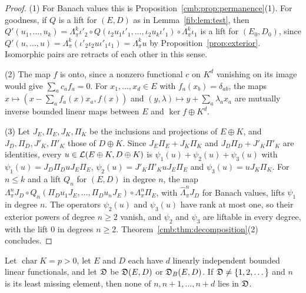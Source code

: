 \begin{proof}
(1) For Banach values this is Proposition~\ref{cmb:prop:permanence}(1). For goodness, if $Q$ is a lift for $(E,D)$ as in
Lemma~\ref{fib:lem:test}, then
$Q'(u_1,\dots,u_k)=\Lambda^k_\pi\iota'_2\circ Q(\iota_2u_1\iota'_1,\dots,\iota_2u_k\iota'_1)\circ\Lambda^k_\pi\iota_1$ is a
lift for $(E_0,D_0)$, since $Q'(u,\dots,u)=\Lambda^k_\pi(\iota'_2\iota_2u\iota'_1\iota_1)=\Lambda^k_\pi u$ by
Proposition~\ref{prop:exterior}. Isomorphic pairs are retracts of each other in this sense.

(2) The map $f$ is onto, since a nonzero functional $c$ on $K^d$ vanishing on its image would give $\sum_ac_af_a=0$. For
$x_1,\dots,x_d\in E$ with $f_a(x_b)=\delta_{ab}$, the maps $x\mapsto(x-\sum_af_a(x)x_a,f(x))$ and
$(y,\lambda)\mapsto y+\sum_a\lambda_ax_a$ are mutually inverse bounded linear maps between $E$ and $\ker f\oplus K^d$.

(3) Let $J_E,\Pi_E,J_K,\Pi_K$ be the inclusions and projections of $E\oplus K$, and $J_D,\Pi_D,J'_K,\Pi'_K$ those of
$D\oplus K$. Since $J_E\Pi_E+J_K\Pi_K$ and $J_D\Pi_D+J'_K\Pi'_K$ are identities, every
$u\in\mathcal L(E\oplus K,D\oplus K)$ is $\psi_1(u)+\psi_2(u)+\psi_3(u)$ with $\psi_1(u)=J_D\Pi_DuJ_E\Pi_E$,
$\psi_2(u)=J'_K\Pi'_KuJ_E\Pi_E$ and $\psi_3(u)=uJ_K\Pi_K$. For $n\le k$ and a lift $Q_n$ for $(E,D)$ in degree $n$, the map
$\Lambda^n_\pi J_D\circ Q_n(\Pi_Du_1J_E,\dots,\Pi_Du_nJ_E)\circ\Lambda^n_\pi\Pi_E$, with $\widehat\Lambda^n_\pi J_D$ for
Banach values, lifts $\psi_1$ in degree $n$. The operators $\psi_2(u)$ and $\psi_3(u)$ have rank at most one, so their exterior
powers of degree $n\ge2$ vanish, and $\psi_2$ and $\psi_3$ are liftable in every degree, with the lift $0$ in degrees $n\ge2$. Theorem~\ref{cmb:thm:decomposition}(2)
concludes.
\end{proof}

\begin{theorem}\label{dgr:thm:gap}
Let $\operatorname{char}K=p>0$, let $E$ and $D$ each have $d$ linearly independent bounded linear functionals, and let
$\mathfrak D$ be $\mathfrak D(E,D)$ or $\mathfrak D_B(E,D)$. If $\mathfrak D\ne\{1,2,\dots\}$ and $n$ is its least missing element, then none of
$n,n+1,\dots,n+d$ lies in $\mathfrak D$.
\end{theorem}

